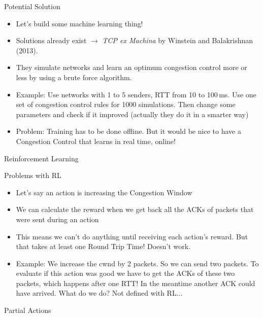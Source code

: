 \documentclass[11pt]{beamer}
\begin{document}
\begin{frame}{Potential Solution}
\begin{itemize}
\item Let's build some machine learning thing!
\item Solutions already exist $\rightarrow$ \textit{TCP ex Machina} by Winstein and Balakrishnan (2013).
\item They simulate networks and learn an optimum congestion control more or less by using a brute force algorithm.
\item Example: Use networks with 1 to 5 senders, RTT from 10 to 100\,ms. Use one set of congestion control rules for 1000 simulations. Then change some parameters and check if it improved (actually they do it in a smarter way)
\item Problem: Training has to be done offline. But it would be nice to have a Congestion Control that learns in real time, online!
\end{itemize}
\end{frame}

\begin{frame}{Reinforcement Learning}
\centering

\end{frame}

\begin{frame}{Problems with RL}
\begin{itemize}
\item Let's say an action is increasing the Congestion Window
\item We can calculate the reward when we get back all the ACKs of packets that were sent during an action
\item This means we can't do anything until receiving each action's reward. But that takes at least one Round Trip Time! Doesn't work.
\item Example: We increase the cwnd by 2 packets. So we can send two packets. To evaluate if this action was good we have to get the ACKs of these two packets, which happens after one RTT!
In the meantime another ACK could have arrived. What do we do? Not defined with RL...
\end{itemize}
\end{frame}

\begin{frame}{Partial Actions}
\centering

\end{frame}
\end{document}
